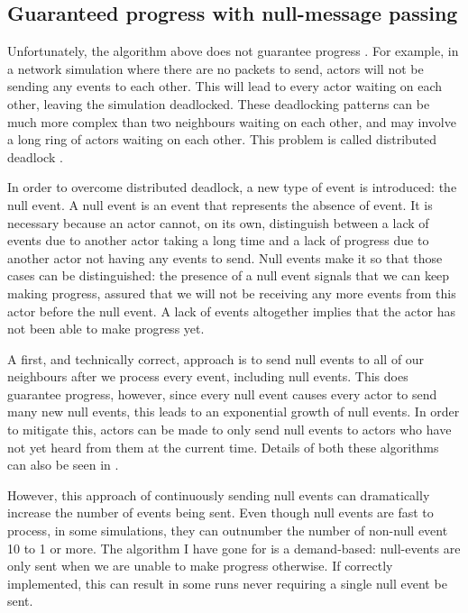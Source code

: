 \subsection{Guaranteed progress with null-message passing} \label{null-messages}

Unfortunately, the algorithm above does not guarantee progress \cite{misra_distributed_1986}.
For example, in a network simulation where there are no packets to send, actors will not be sending any events to each other.
This will lead to every actor waiting on each other, leaving the simulation deadlocked.
These deadlocking patterns can be much more complex than two neighbours waiting on each other, and may involve a long ring of actors waiting on each other.
This problem is called distributed deadlock \cite{misra_distributed_1986}.

In order to overcome distributed deadlock, a new type of event is introduced: the null event.
A null event is an event that represents the absence of event.
It is necessary because an actor cannot, on its own, distinguish between a lack of events due to another actor taking a long time and a lack of progress due to another actor not having any events to send.
Null events make it so that those cases can be distinguished: the presence of a null event signals that we can keep making progress, assured that we will not be receiving any more events from this actor before the null event.
A lack of events altogether implies that the actor has not been able to make progress yet.

A first, and technically correct, approach is to send null events to all of our neighbours after we process every event, including null events.
This does guarantee progress, however, since every null event causes every actor to send many new null events, this leads to an exponential growth of null events.
In order to mitigate this, actors can be made to only send null events to actors who have not yet heard from them at the current time.
Details of both these algorithms can also be seen in \cite{misra_distributed_1986}.

However, this approach of continuously sending null events can dramatically increase the number of events being sent.
Even though null events are fast to process, in some simulations, they can outnumber the number of non-null event 10 to 1 or more.
The algorithm I have gone for  is a demand-based: null-events are only sent when we are unable to make progress otherwise.
If correctly implemented, this can result in some runs never requiring a single null event be sent.

